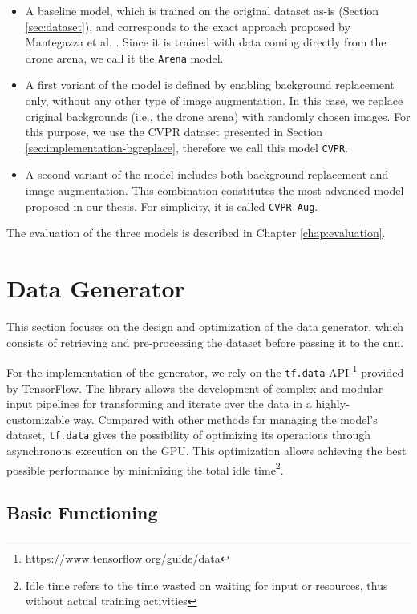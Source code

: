 \begin{itemize}
    \item A baseline model, which is trained on the original dataset as-is (Section \ref{sec:dataset}), and corresponds to the exact approach proposed by Mantegazza et al. \cite{mantegazza2019visionbased}. Since it is trained with data coming directly from the drone arena, we call it the \texttt{Arena} model.
    \item A first variant of the model is defined by enabling background replacement only, without any other type of image augmentation. In this case, we replace original backgrounds (i.e., the drone arena) with randomly chosen images. For this purpose, we use the CVPR dataset presented in Section \ref{sec:implementation-bgreplace}, therefore we call this model \texttt{CVPR}.
    \item A second variant of the model includes both background replacement and image augmentation. This combination constitutes the most advanced model proposed in our thesis. For simplicity, it is called \texttt{CVPR Aug}.
\end{itemize}

The evaluation of the three models is described in Chapter \ref{chap:evaluation}.




\section{Data Generator}
\label{sec:data-generator}

This section focuses on the design and optimization of the data generator, which consists of retrieving and pre-processing the dataset before passing it to the \gls{cnn}.

For the implementation of the generator, we rely on the \texttt{tf.data} API \footnote{\url{https://www.tensorflow.org/guide/data}} provided by TensorFlow. The library allows the development of complex and modular input pipelines for transforming and iterate over the data in a highly-customizable way. Compared with other methods for managing the model's dataset, \texttt{tf.data} gives the possibility of optimizing its operations through asynchronous execution on the GPU. This optimization allows achieving the best possible performance by minimizing the total idle time\footnote{Idle time refers to the time wasted on waiting for input or resources, thus without actual training activities}.



\subsection{Basic Functioning}
\label{subsec:data-generator-basic}

